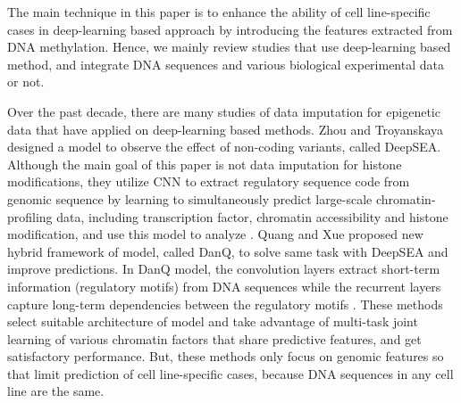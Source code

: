 \hspace{24pt}

The main technique in this paper is to enhance the ability of cell line-specific cases in deep-learning based approach by introducing the features extracted from DNA methylation. Hence, we mainly review studies that use deep-learning based method, and integrate DNA sequences and various biological experimental data or not.

Over the past decade, there are many studies of data imputation for epigenetic data that have applied on deep-learning based methods. Zhou and Troyanskaya designed a model to observe the effect of non-coding variants, called DeepSEA. Although the main goal of this paper is not data imputation for histone modifications, they utilize CNN to extract regulatory sequence code from genomic sequence by learning to simultaneously predict large-scale chromatin-profiling data, including transcription factor, chromatin accessibility and histone modification, and use this model to analyze \cite{zhou2015predicting}. Quang and Xue proposed new hybrid framework of model, called DanQ, to solve same task with DeepSEA and improve predictions. In DanQ model, the convolution layers extract short-term information (regulatory motifs) from DNA sequences while the recurrent layers capture long-term dependencies between the regulatory motifs \cite{quang2016danq}. These methods select suitable architecture of model and take advantage of multi-task joint learning of various chromatin factors that share predictive features, and get satisfactory performance. But, these methods only focus on genomic features so that limit prediction of cell line-specific cases, because DNA sequences in any cell line are the same.


